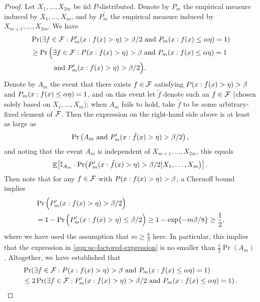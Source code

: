 \documentclass[12pt,a4paper,oneside,onecolumn]{book}
\begin{document}
\begin{proof}
Let $X_{1},\ldots,X_{2m}$ be iid $P$-distributed.  Denote by $P_{m}$ the empirical measure induced by $X_{1},\ldots,X_{m}$, 
and by $P_{m}^{\prime}$ the empirical measure induced by $X_{m+1},\ldots,X_{2m}$.
We have 
\begin{align*}
& \Pr\!\left( \exists f \in \mathcal{F} : P_{m}^{\prime}( x : f(x) > \eta ) > \beta/2 \text{ and } P_{m}( x : f(x) \leq \alpha \eta ) = 1 \right)
\\ & \geq \Pr\Big( \exists f \in \mathcal{F} : P( x : f(x) > \eta ) > \beta \text{ and } P_{m}( x : f(x) \leq \alpha \eta ) = 1 \\
&\quad\quad\quad\text{ and }  P_{m}^{\prime}( x : f(x) > \eta ) > \beta/2 \Big).
\end{align*}
Denote by $A_{m}$ the event that there exists $f \in \mathcal{F}$ 
satisfying $P( x : f(x) > \eta ) > \beta$ and $P_{m}( x : f(x) \leq \alpha \eta ) = 1$, 
and on this event let $\tilde{f}$ denote such an $f \in \mathcal{F}$ (chosen solely based on $X_{1},\ldots,X_{m}$); 
when $A_{m}$ fails to hold, take $\tilde{f}$ to be some arbitrary-fixed element of $\mathcal{F}$.
Then the expression on the right-hand side above is at least as large as 
\begin{equation*}
\Pr\left( A_{m} \text{ and } P_{m}^{\prime}( x : \tilde{f}(x) > \eta ) > \beta/2 \right),
\end{equation*}
and noting that the event $A_{m}$ is independent of $X_{m+1},\ldots,X_{2m}$, this equals
\begin{equation}
\label{eqn:uc-factored-expression}
\mathop{\mathbb{E}}\!\left[ \mathbb{I}_{A_{m}} \cdot \Pr\!\left( P_{m}^{\prime}( x : \tilde{f}(x) > \eta ) > \beta/2 \middle| X_{1},\ldots,X_{m} \right) \right].
\end{equation}
Then note that for any $f \in \mathcal{F}$ with $P( x : f(x) > \eta ) > \beta$, a Chernoff bound implies 
\begin{align*}
  &
  \Pr\Big(  P_{m}^{\prime}( x : f(x) > \eta ) > \beta/2 \Big) 
  \\ &
  = 1 - \Pr\Big( P_{m}^{\prime}( x : f(x) > \eta ) \leq \beta/2 \Big) 
\geq 1 - \exp\!\left\{ - m \beta / 8 \right\} 
\geq \frac{1}{2},
\end{align*}
where we have used the assumption that $m \geq \frac{8}{\beta}$ here.
In particular, this implies that the expression in \eqref{eqn:uc-factored-expression} is no smaller than 
$\frac{1}{2} \Pr(A_{m})$.
Altogether, we have established that 
\begin{align}
& \Pr\!\left( \exists f \in \mathcal{F} : P( x : f(x) > \eta ) > \beta \text{ and } P_{m}( x : f(x) \leq \alpha \eta ) =1 \right) \notag 
\\ & \leq 2 \Pr\!\left( \exists f \in \mathcal{F} : P_{m}^{\prime}( x : f(x) > \eta ) > \beta/2 \text{ and } P_{m}( x : f(x) \leq \alpha \eta ) = 1 \right). \label{eqn:uc-ghost-ub}
\end{align}


\end{proof}
\end{document}
